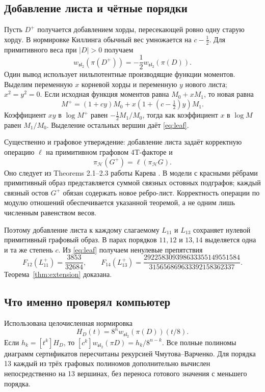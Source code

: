 \documentclass[11pt,a4paper]{article}
\numberwithin{equation}{section}
\theoremstyle{definition}
\theoremstyle{remark}
\newcommand{\sll}{\mathfrak{sl}}
\begin{document}
\subsection{Добавление листа и чётные порядки}

Пусть $D^+$ получается добавлением хорды, пересекающей ровно одну
старую хорду. В нормировке Киллинга обычный вес умножается на
$c-\tfrac12$. Для примитивного веса при $|D|>0$ получаем
\begin{equation}\label{eq:leaf}
 w_{\sll_2}(\pi(D^+))=-\frac12w_{\sll_2}(\pi(D)).
\end{equation}
Один вывод использует нильпотентные производящие функции моментов.
Выделим переменную $x$ корневой хорды и переменную $y$ нового листа;
$x^2=y^2=0$. Если исходная функция моментов равна $M_0+xM_1$,
то новая равна
\[
 M^+=(1+cy)M_0+x(1+(c-\tfrac12)y)M_1.
\]
Коэффициент $xy$ в $\log M^+$ равен
$-\tfrac12 M_1/M_0$, тогда как коэффициент $x$ в $\log M$ равен
$M_1/M_0$. Выделение остальных вершин даёт \eqref{eq:leaf}.

Существенно и графовое утверждение: добавление листа задаёт корректную
операцию $\ell$ на примитивном графовом 4T-факторе и
\[
 \pi_{\mathcal H}(G^+)=\ell(\pi_{\mathcal H}G).
\]
Оно следует из Theorems 2.1--2.3 работы Карева \cite{karev}.
В модели с красными рёбрами примитивный образ представляется суммой
связных остовных подграфов; каждый связный остов $G^+$ обязан содержать
новое ребро-лист. Корректность операции по модулю отношений обеспечивается
указанной теоремой, а не одним лишь численным равенством весов.

Поэтому добавление листа к каждому слагаемому $L_{11}$ и $L_{13}$
сохраняет нулевой примитивный графовый образ. В парах порядков
$11,12$ и $13,14$ выделяется одна и та же степень $c$.
Из \eqref{eq:leaf} получаем ненулевые препятствия
\[
 F_{12}(L_{11}^+)=\frac{3853}{32684},\qquad
 F_{14}(L_{13}^+)=\frac{292258309398633355149551584}
 {315656869633392158362337}.
\]
Теорема~\ref{thm:extension} доказана.

\subsection{Что именно проверял компьютер}

Использована целочисленная нормировка
\[
 H_D(t)=8^n w_{\sll_2}(\pi(D))(t/8).
\]
Если $h_k=[t^k]H_D$, то $[c^k]w_{\sll_2}(\pi D)=h_k/8^{n-k}$.
Все полные полиномы диаграмм сертификатов пересчитаны рекурсией
Чмутова--Варченко. Для порядка 13 каждый из трёх графовых полиномов
дополнительно вычислен непосредственно на 13 вершинах, без переноса
готового значения с меньшего порядка.
\end{document}
